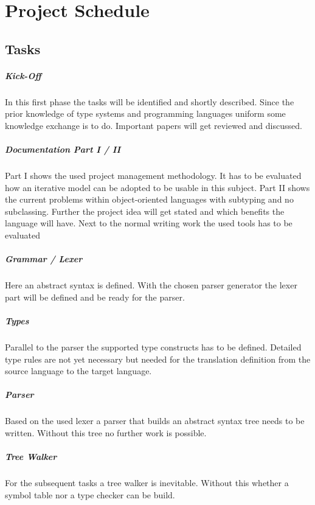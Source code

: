 \chapter{Project Schedule}
\section{Tasks}
\paragraph{Kick-Off}
In this first phase the tasks will be identified and shortly
described. Since the prior knowledge of type systems and programming
languages uniform some knowledge exchange is to do. Important papers
will get reviewed and discussed.

\paragraph{Documentation Part I / II}
Part I shows the used project management methodology. It has to be
evaluated how an iterative model can be adopted to be usable in this
subject. Part II shows the current problems within object-oriented
languages with subtyping and no subclassing. Further the project idea
will get stated and which benefits the language will have. Next to the
normal writing work the used tools has to be evaluated

\paragraph{Grammar / Lexer}
Here an abstract syntax is defined. With the chosen parser generator
the lexer part will be defined and be ready for the parser.

\paragraph{Types}
Parallel to the parser the supported type constructs has to be
defined. Detailed type rules are not yet necessary but needed for the
translation definition from the source language to the target language.

\paragraph{Parser}
Based on the used lexer a parser that builds an abstract syntax tree
needs to be written. Without this tree no further work is possible.

\paragraph{Tree Walker}
For the subsequent tasks a tree walker is inevitable. Without this
whether a symbol table nor a type checker can be build.

